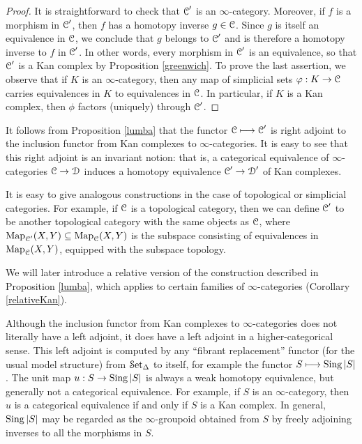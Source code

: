 \begin{1.2.5 inf-gpoids and classical homotopy}
\begin{proof}
It is straightforward to check that $\operatorname{\mathcal{C}}'$ is an $\infty$-category. Moreover, if
$f$ is a morphism in $\operatorname{\mathcal{C}}'$, then $f$ has a homotopy inverse $g \in \operatorname{\mathcal{C}}$. Since
$g$ is itself an equivalence in $\operatorname{\mathcal{C}}$, we conclude that $g$ belongs to $\operatorname{\mathcal{C}}'$ and
is therefore a homotopy inverse to $f$ in $\operatorname{\mathcal{C}}'$. In other words, every morphism in $\operatorname{\mathcal{C}}'$ is an equivalence, so that $\operatorname{\mathcal{C}}'$ is a Kan complex by Proposition \ref{greenwich}. To prove the last assertion, we observe that if $K$ is an $\infty$-category, then any map of simplicial sets
$\varphi: K \rightarrow \operatorname{\mathcal{C}}$ carries equivalences in $K$ to equivalences in $\operatorname{\mathcal{C}}$. In particular, if
$K$ is a Kan complex, then $\phi$ factors (uniquely) through $\operatorname{\mathcal{C}}'$.
\end{proof}

It follows from Proposition \ref{lumba} that the functor
$\operatorname{\mathcal{C}} \longmapsto \operatorname{\mathcal{C}}'$ is right adjoint to
the inclusion functor from Kan complexes to $\infty$-categories. It is easy to see that this right adjoint is an invariant notion: that is, a categorical equivalence of $\infty$-categories $\operatorname{\mathcal{C}} \rightarrow \operatorname{\mathcal{D}}$ induces a homotopy equivalence
$\operatorname{\mathcal{C}}' \rightarrow \operatorname{\mathcal{D}}'$ of Kan complexes. 

\begin{remark}
It is easy to give analogous constructions in the case of topological or simplicial categories. For example, if $\operatorname{\mathcal{C}}$ is a topological category, then we can define $\operatorname{\mathcal{C}}'$ to be another topological category with the same objects as $\operatorname{\mathcal{C}}$, where $\operatorname{{Map}}_{\operatorname{\mathcal{C}}'}(X,Y) \subseteq \operatorname{{Map}}_{\operatorname{\mathcal{C}}}(X,Y)$ is the subspace consisting of equivalences in $\operatorname{{Map}}_{\operatorname{\mathcal{C}}}(X,Y)$, equipped with the subspace topology.
\end{remark}

\begin{remark}
We will later introduce a relative version of the construction described in Proposition \ref{lumba}, which applies to certain families of $\infty$-categories (Corollary \ref{relativeKan}).
\end{remark}

Although the inclusion functor from Kan complexes to $\infty$-categories does not
literally have a left adjoint, it does have a left adjoint in a higher-categorical sense. This left adjoint is computed by any ``fibrant replacement'' functor (for the usual model structure) from $\operatorname{\mathcal{S}et_{\Delta}}$ to itself, for
example the functor $S \longmapsto \operatorname{Sing} |S|$.
The unit map $u: S \rightarrow
\operatorname{Sing} |S|$ is always a weak homotopy equivalence, but generally not a categorical equivalence. For example, if $S$ is an $\infty$-category, then $u$ is a categorical equivalence if and only if $S$ is a Kan complex. In general, $\operatorname{Sing} |S|$ may be regarded as the $\infty$-groupoid
obtained from $S$ by freely adjoining inverses to all the
morphisms in $S$.


\end{1.2.5 inf-gpoids and classical homotopy}
